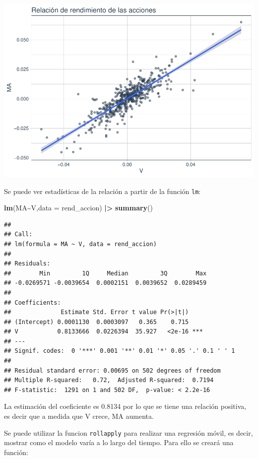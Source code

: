 \documentclass[
]{book}
\newenvironment{Shaded}{\begin{snugshade}}{\end{snugshade}}
\newcommand{\AttributeTok}[1]{\textcolor[rgb]{0.13,0.29,0.53}{#1}}
\newcommand{\FunctionTok}[1]{\textcolor[rgb]{0.13,0.29,0.53}{\textbf{#1}}}
\newcommand{\NormalTok}[1]{#1}
\newcommand{\SpecialCharTok}[1]{\textcolor[rgb]{0.81,0.36,0.00}{\textbf{#1}}}
\begin{document}
\includegraphics{Libro_TidyQualityTools_files/figure-latex/unnamed-chunk-71-1.pdf}

Se puede ver estadísticas de la relación a partir de la función \texttt{lm}:

\begin{Shaded}
\begin{Highlighting}[]
\FunctionTok{lm}\NormalTok{(MA}\SpecialCharTok{\textasciitilde{}}\NormalTok{V,}\AttributeTok{data =}\NormalTok{ rend\_accion) }\SpecialCharTok{|\textgreater{}} \FunctionTok{summary}\NormalTok{()}
\end{Highlighting}
\end{Shaded}

\begin{verbatim}
## 
## Call:
## lm(formula = MA ~ V, data = rend_accion)
## 
## Residuals:
##        Min         1Q     Median         3Q        Max 
## -0.0269571 -0.0039654  0.0002151  0.0039652  0.0289459 
## 
## Coefficients:
##              Estimate Std. Error t value Pr(>|t|)    
## (Intercept) 0.0001130  0.0003097   0.365    0.715    
## V           0.8133666  0.0226394  35.927   <2e-16 ***
## ---
## Signif. codes:  0 '***' 0.001 '**' 0.01 '*' 0.05 '.' 0.1 ' ' 1
## 
## Residual standard error: 0.00695 on 502 degrees of freedom
## Multiple R-squared:   0.72,  Adjusted R-squared:  0.7194 
## F-statistic:  1291 on 1 and 502 DF,  p-value: < 2.2e-16
\end{verbatim}

La estimación del coeficiente es 0.8134 por lo que se tiene una relación positiva, es decir que a medida que V crece, MA aumenta.

Se puede utilizar la funcion \texttt{rollapply} para realizar una regresión móvil, es decir, mostrar como el modelo varía a lo largo del tiempo. Para ello se creará una función:
\end{document}
